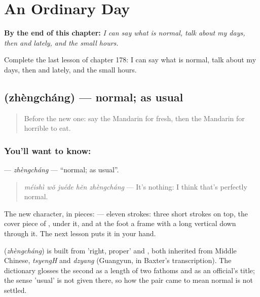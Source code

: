 
\chapter{An Ordinary Day}
\label{ch:zh-an-ordinary-day}

\begin{chapteropening}
\textbf{By the end of this chapter:} \emph{I can say what is normal, talk about my days, then and lately, and the small hours.}

Complete the last lesson of chapter 178: I can say what is normal, talk about my days, then and lately, and the small hours.
\end{chapteropening}

\section[\texorpdfstring{\zh{正常} (zhèngcháng)}{正常 (zhèngcháng)}]{ (zhèngcháng) — normal; as usual}

\label{lesson:ZH-C178-zhengchang}



\begin{quote}
Before the new one: say the Mandarin for fresh, then the Mandarin for horrible to eat.
\end{quote}

\subsection*{You'll want to know: }
\textbf{} — \emph{zhèngcháng} — \textquotedblleft{}normal; as usual\textquotedblright{}.

\begin{quote}
\textbf{} \emph{méishì wǒ juéde hěn zhèngcháng} — It's nothing: I think that's perfectly normal.
\end{quote}

The new character, in pieces:  — eleven strokes: three short strokes on top, the cover piece of ,  under it, and at the foot a frame with a long vertical down through it. The next lesson puts it in your hand.

\begin{cousinweb}
\textbf{} (\emph{zhèngcháng}) is built from  'right, proper' and , both inherited from Middle Chinese, \emph{tsyengH} and \emph{dzyang} (Guangyun, in Baxter's transcription). The dictionary glosses the second as a length of two fathoms and as an official's title; the sense 'usual' is not given there, so how the pair came to mean normal is not settled.
\end{cousinweb}

